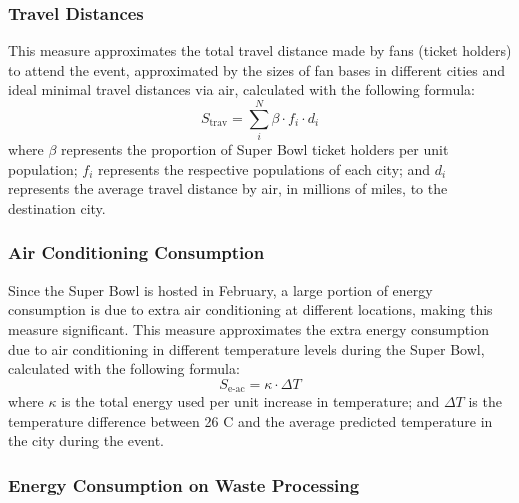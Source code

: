 \documentclass{mcmthesis}
\begin{document}
\subsubsection{Travel Distances} \label{subsubsec:indicator_trav_distance}

This measure approximates the total travel distance made by fans (ticket holders) to attend the event, approximated by the sizes of fan bases in different cities and ideal minimal travel distances via air, calculated with the following formula: 
\begin{equation} \label{eq:trav_indicator}
    S_\text{trav} = \sum^N_i \beta \cdot f_i \cdot d_i
\end{equation}
where $\beta$ represents the proportion of Super Bowl ticket holders per unit population; $f_i$ represents the respective populations of each city; and $d_i$ represents the average travel distance by air, in millions of miles, to the destination city. 

\subsubsection{Air Conditioning Consumption} \label{subsubsec:indicator_aircon}

 Since the Super Bowl is hosted in February, a large portion of energy consumption is due to extra air conditioning at different locations, making this measure significant. This measure approximates the extra energy consumption due to air conditioning in different temperature levels during the Super Bowl, calculated with the following formula: 
\begin{equation} \label{eq:aircon}
    S_\text{e-ac} = \kappa \cdot \Delta T
\end{equation}
where $\kappa$ is the total energy used per unit increase in temperature; and $\Delta T$ is the temperature difference between 26 \degree C and the average predicted temperature in the city during the event.

\subsubsection{Energy Consumption on Waste Processing} \label{subsubsec:indicator_waste_processing}
\end{document}
